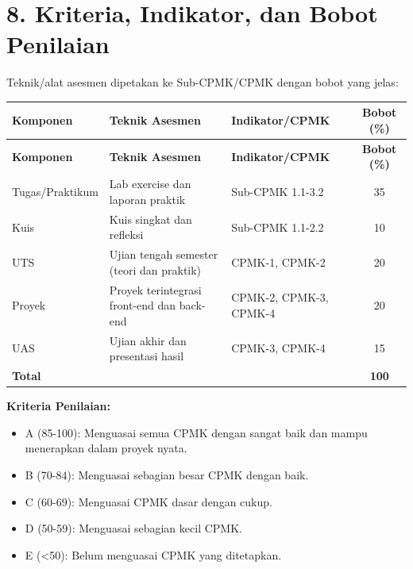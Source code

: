 \documentclass[12pt,a4paper]{article}
\begin{document}
\vspace{0.5cm}

\section*{8. Kriteria, Indikator, dan Bobot Penilaian}

Teknik/alat asesmen dipetakan ke Sub-CPMK/CPMK dengan bobot yang jelas:

\begin{longtable}{|>{\raggedright\arraybackslash}p{2.8cm}|>{\raggedright\arraybackslash}p{4cm}|>{\raggedright\arraybackslash}p{5.7cm}|c|}
\hline
\textbf{Komponen} & \textbf{Teknik Asesmen} & \textbf{Indikator/CPMK} & \textbf{Bobot (\%)} \\
\hline
\endfirsthead
\hline
\textbf{Komponen} & \textbf{Teknik Asesmen} & \textbf{Indikator/CPMK} & \textbf{Bobot (\%)} \\
\hline
\endhead
\hline
\endfoot

Tugas/Praktikum & Lab exercise dan laporan praktik & Sub-CPMK 1.1-3.2 & 35 \\
\hline
Kuis & Kuis singkat dan refleksi & Sub-CPMK 1.1-2.2 & 10 \\
\hline
UTS & Ujian tengah semester (teori dan praktik) & CPMK-1, CPMK-2 & 20 \\
\hline
Proyek & Proyek terintegrasi front-end dan back-end & CPMK-2, CPMK-3, CPMK-4 & 20 \\
\hline
UAS & Ujian akhir dan presentasi hasil & CPMK-3, CPMK-4 & 15 \\
\hline
\textbf{Total} & & & \textbf{100} \\
\hline
\end{longtable}

\textbf{Kriteria Penilaian:}
\begin{itemize}[leftmargin=*]
  \item A (85-100): Menguasai semua CPMK dengan sangat baik dan mampu menerapkan dalam proyek nyata.
  \item B (70-84): Menguasai sebagian besar CPMK dengan baik.
  \item C (60-69): Menguasai CPMK dasar dengan cukup.
  \item D (50-59): Menguasai sebagian kecil CPMK.
  \item E (<50): Belum menguasai CPMK yang ditetapkan.
\end{itemize}
\end{document}
